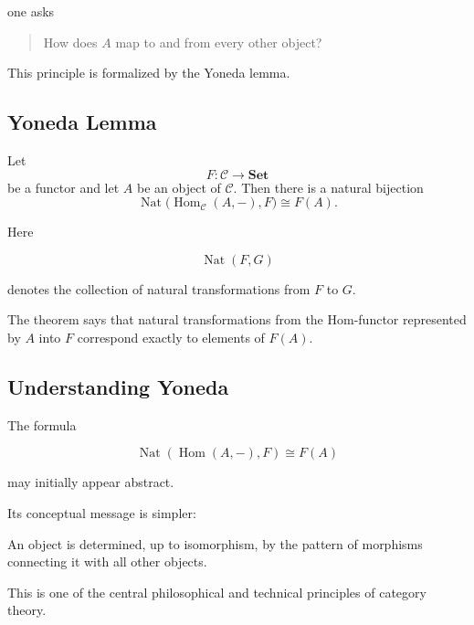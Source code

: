 one asks

\begin{quote}
How does \(A\) map to and from every other object?
\end{quote}

This principle is formalized by the Yoneda lemma.

\subsection{Yoneda Lemma}
\label{subsec:yoneda-lemma}

\begin{theorem}
Let
\[ F:\mathcal C\to\mathbf{Set} \]
be a functor and let \(A\) be an object of \(\mathcal C\). Then there is a
natural bijection
\[ \operatorname{Nat}
\bigl(\operatorname{Hom}_{\mathcal C}(A,-),F\bigr)
\cong F(A). \]
\end{theorem}

Here

\[ \operatorname{Nat}(F,G) \]

denotes the collection of natural transformations from \(F\) to \(G\).

The theorem says that natural transformations from the Hom-functor
represented by \(A\) into \(F\) correspond exactly to elements of \(F(A)\).

\subsection{Understanding Yoneda}
\label{subsec:understanding-yoneda}

The formula

\[ \operatorname{Nat}(\operatorname{Hom}(A,-),F)\cong F(A) \]

may initially appear abstract.

Its conceptual message is simpler:

\begin{conceptbox}
An object is determined, up to isomorphism, by the pattern of morphisms
connecting it with all other objects.
\end{conceptbox}

This is one of the central philosophical and technical principles of
category theory.

